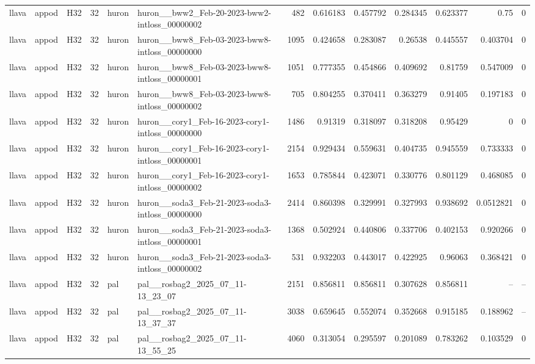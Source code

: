 \begin{longtable}{lllrllrrrrrrr}
llava & appod & H32 & 32 & huron & huron\_\_bww2\_Feb-20-2023-bww2-intloss\_00000002 & 482 & 0.616183 & 0.457792 & 0.284345 & 0.623377 & 0.75 & 0 \\
llava & appod & H32 & 32 & huron & huron\_\_bww8\_Feb-03-2023-bww8-intloss\_00000000 & 1095 & 0.424658 & 0.283087 & 0.26538 & 0.445557 & 0.403704 & 0 \\
llava & appod & H32 & 32 & huron & huron\_\_bww8\_Feb-03-2023-bww8-intloss\_00000001 & 1051 & 0.777355 & 0.454866 & 0.409692 & 0.81759 & 0.547009 & 0 \\
llava & appod & H32 & 32 & huron & huron\_\_bww8\_Feb-03-2023-bww8-intloss\_00000002 & 705 & 0.804255 & 0.370411 & 0.363279 & 0.91405 & 0.197183 & 0 \\
llava & appod & H32 & 32 & huron & huron\_\_cory1\_Feb-16-2023-cory1-intloss\_00000000 & 1486 & 0.91319 & 0.318097 & 0.318208 & 0.95429 & 0 & 0 \\
llava & appod & H32 & 32 & huron & huron\_\_cory1\_Feb-16-2023-cory1-intloss\_00000001 & 2154 & 0.929434 & 0.559631 & 0.404735 & 0.945559 & 0.733333 & 0 \\
llava & appod & H32 & 32 & huron & huron\_\_cory1\_Feb-16-2023-cory1-intloss\_00000002 & 1653 & 0.785844 & 0.423071 & 0.330776 & 0.801129 & 0.468085 & 0 \\
llava & appod & H32 & 32 & huron & huron\_\_soda3\_Feb-21-2023-soda3-intloss\_00000000 & 2414 & 0.860398 & 0.329991 & 0.327993 & 0.938692 & 0.0512821 & 0 \\
llava & appod & H32 & 32 & huron & huron\_\_soda3\_Feb-21-2023-soda3-intloss\_00000001 & 1368 & 0.502924 & 0.440806 & 0.337706 & 0.402153 & 0.920266 & 0 \\
llava & appod & H32 & 32 & huron & huron\_\_soda3\_Feb-21-2023-soda3-intloss\_00000002 & 531 & 0.932203 & 0.443017 & 0.422925 & 0.96063 & 0.368421 & 0 \\
llava & appod & H32 & 32 & pal & pal\_\_rosbag2\_2025\_07\_11-13\_23\_07 & 2151 & 0.856811 & 0.856811 & 0.307628 & 0.856811 & -- & -- \\
llava & appod & H32 & 32 & pal & pal\_\_rosbag2\_2025\_07\_11-13\_37\_37 & 3038 & 0.659645 & 0.552074 & 0.352668 & 0.915185 & 0.188962 & -- \\
llava & appod & H32 & 32 & pal & pal\_\_rosbag2\_2025\_07\_11-13\_55\_25 & 4060 & 0.313054 & 0.295597 & 0.201089 & 0.783262 & 0.103529 & 0 \\
\end{longtable}
